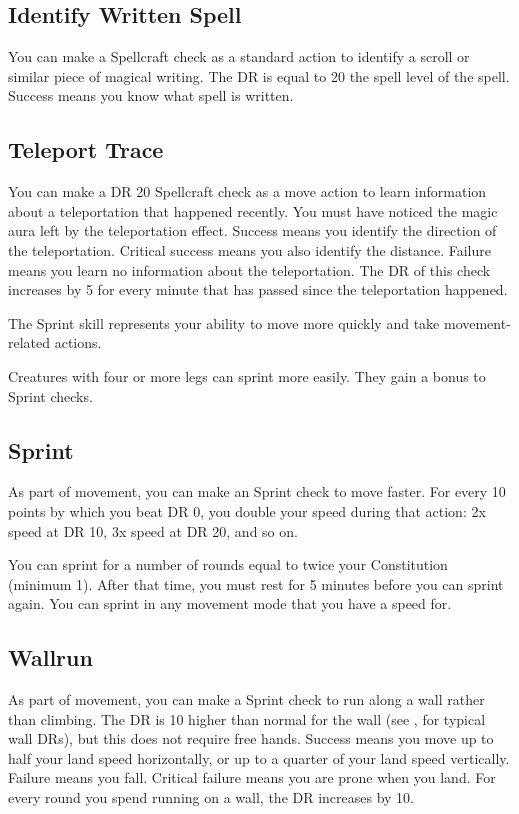     \subsection{Identify Written Spell}
        You can make a Spellcraft check as a standard action to identify a scroll or similar piece of magical writing. The DR is equal to 20 \add the spell level of the spell. Success means you know what spell is written.

    \subsection{Teleport Trace}
        You can make a DR 20 Spellcraft check as a move action to learn information about a teleportation that happened recently. You must have noticed the magic aura left by the teleportation effect. Success means you identify the direction of the teleportation. Critical success means you also identify the distance. Failure means you learn no information about the teleportation. The DR of this check increases by 5 for every minute that has passed since the teleportation happened.

        The Sprint skill represents your ability to move more quickly and take movement-related actions.

         Creatures with four or more legs can sprint more easily.
        They gain a  bonus to Sprint checks.

    \subsection{Sprint}
        As part of movement, you can make an Sprint check to move faster. For every 10 points by which you beat DR 0, you double your speed during that action: 2x speed at DR 10, 3x speed at DR 20, and so on.
        
        You can sprint for a number of rounds equal to twice your Constitution (minimum 1).
        After that time, you must rest for 5 minutes before you can sprint again. You can sprint in any movement mode that you have a speed for.

    \subsection{Wallrun}
        As part of movement, you can make a Sprint check to run along a wall rather than climbing. The DR is 10 higher than normal for the wall (see , for typical wall DRs), but this does not require free hands. Success means you move up to half your land speed horizontally, or up to a quarter of your land speed vertically. Failure means you fall. Critical failure means you are prone when you land. For every round you spend running on a wall, the DR increases by 10.

